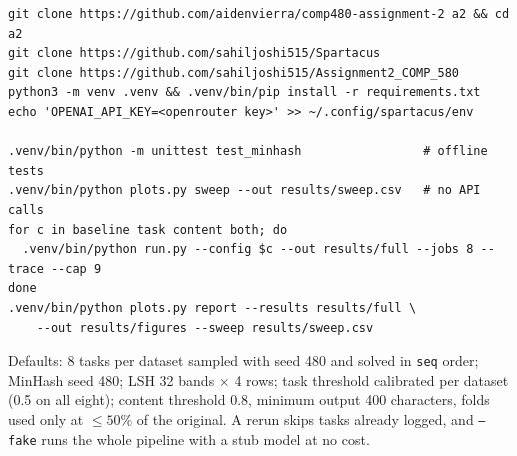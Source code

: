 \documentclass[11pt]{article}
\begin{document}
\begin{lstlisting}
git clone https://github.com/aidenvierra/comp480-assignment-2 a2 && cd a2
git clone https://github.com/sahiljoshi515/Spartacus
git clone https://github.com/sahiljoshi515/Assignment2_COMP_580
python3 -m venv .venv && .venv/bin/pip install -r requirements.txt
echo 'OPENAI_API_KEY=<openrouter key>' >> ~/.config/spartacus/env

.venv/bin/python -m unittest test_minhash                 # offline tests
.venv/bin/python plots.py sweep --out results/sweep.csv   # no API calls
for c in baseline task content both; do
  .venv/bin/python run.py --config $c --out results/full --jobs 8 --trace --cap 9
done
.venv/bin/python plots.py report --results results/full \
    --out results/figures --sweep results/sweep.csv
\end{lstlisting}

Defaults: 8 tasks per dataset sampled with seed 480 and solved in \texttt{seq} order; MinHash
seed 480; LSH 32 bands $\times$ 4 rows; task threshold calibrated per dataset (0.5 on all
eight); content threshold 0.8, minimum output 400 characters, folds used only at
$\le 50\%$ of the original. A rerun skips tasks already logged, and \texttt{--fake} runs the
whole pipeline with a stub model at no cost.
\end{document}
